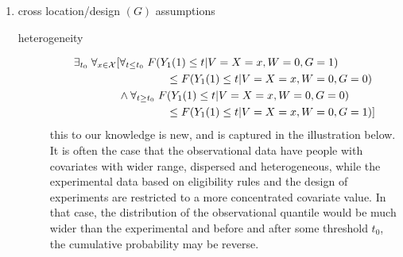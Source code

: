 \documentclass{article}
\begin{document}
\begin{enumerate}[(1)]
    \item cross location/design $(G)$ assumptions
        \begin{description}
            \item[heterogeneity]
            \begin{align*}
                &\exists_{t_0}\;\forall_{x\in\mathcal{X}} [ \forall_{t \leq t_0}\;F(Y_1(1) \leq t |V = X=x ,W= 0, G=1) \\
                &\hphantom{\exists_{t_0}\;\forall_{x\in\mathcal{X}} [ \forall_{t \leq t_0}}\qquad\leq F(Y_1(1) \leq t |V = X=x ,W= 0, G=0)   \\
                &\qquad\qquad\land \forall_{ t \geq t_0}\;F(Y_1(1) \leq t |V = X=x ,W= 0, G=0) \\
                &\hphantom{\exists_{t_0}\;\forall_{x\in\mathcal{X}} [ \forall_{t \leq t_0}}\qquad\leq F(Y_1(1) \leq t |V = X=x ,W= 0, G=1)]
            \end{align*}
            this to our knowledge is new, and is captured in the illustration below. It is often the case that the observational data have people with covariates with wider range, dispersed and heterogeneous, while the experimental data based on eligibility rules and the design of experiments are restricted to a more concentrated covariate value. In that case, the distribution of the observational quantile would be much wider than the experimental and before and after some threshold $t_0$, the cumulative probability may be reverse. 
        \end{description}
\end{enumerate}
\end{document}
